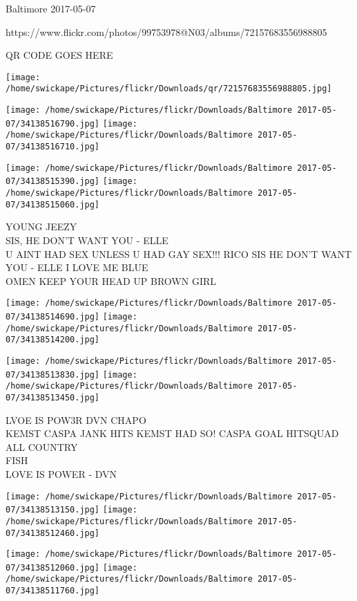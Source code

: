 \documentclass[10pt,letterpaper]{article}
\begin{document}
Baltimore 2017-05-07

https://www.flickr.com/photos/99753978@N03/albums/72157683556988805

QR CODE GOES HERE

\texttt{[image: /home/swickape/Pictures/flickr/Downloads/qr/72157683556988805.jpg]}
\pagebreak

\texttt{[image: /home/swickape/Pictures/flickr/Downloads/Baltimore 2017-05-07/34138516790.jpg]}
\texttt{[image: /home/swickape/Pictures/flickr/Downloads/Baltimore 2017-05-07/34138516710.jpg]}

\texttt{[image: /home/swickape/Pictures/flickr/Downloads/Baltimore 2017-05-07/34138515390.jpg]}
\texttt{[image: /home/swickape/Pictures/flickr/Downloads/Baltimore 2017-05-07/34138515060.jpg]}

YOUNG JEEZY\\
SIS, HE DON'T WANT YOU {-} ELLE\\
U AINT HAD SEX UNLESS U HAD GAY SEX!!! RICO SIS HE DON'T WANT YOU {-} ELLE I LOVE ME BLUE\\
OMEN KEEP YOUR HEAD UP BROWN GIRL\\
\pagebreak

\texttt{[image: /home/swickape/Pictures/flickr/Downloads/Baltimore 2017-05-07/34138514690.jpg]}
\texttt{[image: /home/swickape/Pictures/flickr/Downloads/Baltimore 2017-05-07/34138514200.jpg]}

\texttt{[image: /home/swickape/Pictures/flickr/Downloads/Baltimore 2017-05-07/34138513830.jpg]}
\texttt{[image: /home/swickape/Pictures/flickr/Downloads/Baltimore 2017-05-07/34138513450.jpg]}

LVOE IS POW3R DVN CHAPO\\
KEMST CASPA JANK HITS KEMST HAD SO! CASPA GOAL HITSQUAD ALL COUNTRY\\
FISH\\
LOVE IS POWER {-} DVN\\
\pagebreak

\texttt{[image: /home/swickape/Pictures/flickr/Downloads/Baltimore 2017-05-07/34138513150.jpg]}
\texttt{[image: /home/swickape/Pictures/flickr/Downloads/Baltimore 2017-05-07/34138512460.jpg]}

\texttt{[image: /home/swickape/Pictures/flickr/Downloads/Baltimore 2017-05-07/34138512060.jpg]}
\texttt{[image: /home/swickape/Pictures/flickr/Downloads/Baltimore 2017-05-07/34138511760.jpg]}
\end{document}
